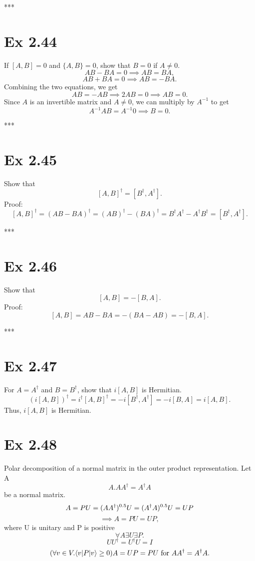 \documentclass{article}
\newcommand{\0}{{$|0\rangle$}}
\newcommand{\1}{{$|1\rangle$}}
\begin{document}
***

\newpage
\section*{Ex 2.44 } 
If $[A,B] = 0$ and $\{A,B\} = 0$, show that $B=0$ if $A \neq 0$.  
$$
AB - BA = 0 \implies AB = BA,
$$
$$
AB + BA = 0 \implies AB = -BA.
$$
Combining the two equations, we get  
$$
AB = -AB \implies 2AB = 0 \implies AB = 0.
$$  
Since $A$ is an invertible matrix and $A \neq 0$, we can multiply by $A^{-1}$ to get  
$$
A^{-1} A B = A^{-1} 0 \implies B = 0.
$$

***

\newpage
\section*{Ex 2.45 } 
Show that  
$$
[A,B]^\dagger = [B^\dagger, A^\dagger].
$$
Proof:  
$$
[A,B]^\dagger = (AB - BA)^\dagger = (AB)^\dagger - (BA)^\dagger = B^\dagger A^\dagger - A^\dagger B^\dagger = [B^\dagger, A^\dagger].
$$

***

\newpage
\section*{Ex 2.46 } 
Show that  
$$
[A,B] = -[B,A].
$$
Proof:  
$$
[A,B] = AB - BA = -(BA - AB) = -[B,A].
$$

***

\newpage
\section*{Ex 2.47 } 
For $A = A^\dagger$ and $B = B^\dagger$, show that $i[A,B]$ is Hermitian.  
$$
(i [A,B])^\dagger = i^\dagger [A,B]^\dagger = -i [B^\dagger, A^\dagger] = -i [B,A] = i [A,B].
$$  
Thus, $i[A,B]$ is Hermitian.


\newpage
\section*{Ex 2.48}
Polar decomposition of a normal matrix
in the outer product representation. Let A
$$
A.AA^\dagger = A^\dagger A
$$
be a normal matrix.
$$
A=PU = (AA^\dagger)^{0.5} U \\
= (A^\dagger A)^{0.5} U = UP
$$
$$
\implies A=PU=UP,
$$
where U is unitary
and P is positive
$$
\forall A \exists U \exists P.
$$
$$
UU^\dagger=U^\dagger U=I
$$
$$
(\forall v \in V. \langle v | P| v \rangle \ge 0) \\
A=UP=PU \text{ for } AA^\dagger = A^\dagger A.
$$
\end{document}
